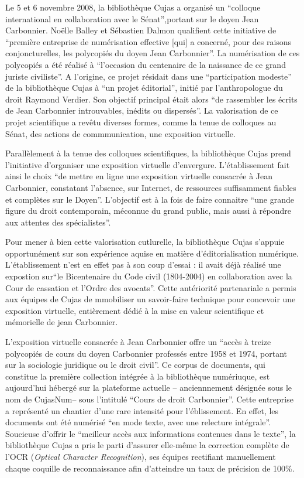 Le 5 et 6 novembre 2008, la bibliothèque Cujas a organisé un \enquote{colloque international en collaboration avec le Sénat},portant sur le doyen Jean Carbonnier. Noëlle Balley et Sébastien Dalmon qualifient cette initiative de \enquote{première entreprise de numérisation effective [qui] a concerné, pour des raisons conjoncturelles, les polycopiés du doyen Jean Carbonnier}. La numérisation de ces polycopiés a été réalisé à \enquote{l'occasion du centenaire de la naissance de ce grand juriste civiliste}. A l'origine, ce projet résidait dans une \enquote{participation modeste} de la bibliothèque Cujas à \enquote{un projet éditorial}, initié par l'anthropologue du droit Raymond Verdier. Son objectif principal était alors \enquote{de rassembler les écrits de Jean Carbonnier introuvables, inédits ou dispersés}. La valorisation de ce projet scientifique a revêtu diverses formes, comme la tenue de colloques au Sénat, des actions de commmunication, une exposition virtuelle.

Parallèlement à la tenue des colloques scientifiques, la bibliothèque Cujas prend l'initiative d'organiser une exposition virtuelle d'envergure. L'établissement fait ainsi le choix \enquote{de mettre en ligne une exposition virtuelle consacrée à Jean Carbonnier, constatant l'absence, sur Internet, de ressources suffisamment fiables et complètes sur le Doyen}. L'objectif est à la fois de faire connaitre \enquote{une grande figure du droit contemporain, méconnue du grand public, mais aussi à répondre aux attentes des spécialistes}. 

Pour mener à bien cette valorisation cutlurelle, la bibliothèque Cujas s'appuie opportunément sur son expérience aquise en matière d'éditorialisation numérique. L'établissement n'est en effet pas à son coup d'essai : il avait déjà réalisé une expostion sur\enquote{le Bicentenaire du Code civil (1804-2004) en collaboration avec la Cour de cassation et l'Ordre des avocats}. Cette antériorité partenariale a permis aux équipes de Cujas de mmobiliser un savoir-faire technique pour concevoir une exposition virtuelle, entièrement dédié à la mise en valeur scientifique et mémorielle de jean Carbonnier.

L'exposition virtuelle consacrée à Jean Carbonnier offre un \enquote{accès à treize polycopiés de cours du doyen Carbonnier professés entre 1958 et 1974, portant sur la sociologie juridique ou le droit civil}. Ce corpus de documents, qui constitue la première collection intégrée à la bibliothèque numériuque, est aujourd'hui hébergé sur la plateforme actuelle -- anciennnement désignée sous le nom de CujasNum-- sous l'intitulé \enquote{Cours de droit Carbonnier}. Cette entreprise a représenté un chantier d'une rare intensité pour l'éblissement. En effet, les documents ont été numérisé \enquote{en mode texte, avec une relecture intégrale}. Soucieuse d'offrir le \enquote{meilleur accès aux informations contenues dans le texte}, la bibliothèque Cujas a pris le parti d'assurer elle-même la correction complète de l'OCR (\textit{Optical Character Recognition}), ses équipes rectifiant manuellement  chaque coquille de reconnaissance afin d'atteindre un taux de précision de 100\%. 

